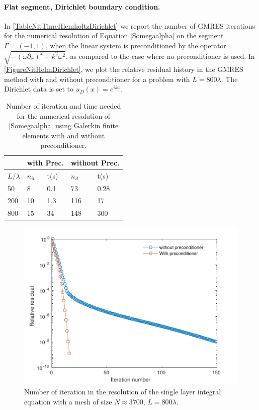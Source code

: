 \documentclass[a4paper]{article}
\begin{document}
\paragraph{Flat segment, Dirichlet boundary condition.} In \autoref{TableNitTimeHlemholtzDirichlet} we report the number of GMRES iterations for the numerical resolution of Equation \eqref{Somegaalpha} on the segment $\Gamma = (-1,1)$, when the linear system is preconditioned by the operator $\sqrt{-(\omega \partial_x)^2 - k^2 \omega^2}$, as compared to the case where no preconditioner is used.  In \autoref{FigureNitHelmDirichlet}, we plot the relative residual history in the GMRES method with and without preconditioner for a problem with $L = 800 \lambda$. The Dirichlet data is set to $u_D(x) = e^{ikx}$. 
\begin{table}[H]
	\begin{center}
		\begin{tabular}{|| m{4em} | m{4em} | m{4em} | m{4em} | m{4em}||} 
			\hline
			\multicolumn{1}{||c|}{ }&
			\multicolumn{2}{c|}{with Prec.}&\multicolumn{2}{c||}{without Prec.}\\
			\hline
			$L/\lambda$ & $n_{it}$& t(s) & $n_{it}$ & t(s)\\
			\hline\hline
			50 & 8 & 0.1 & 73 & 0.28\\
			\hline
			200 & 10 & 1.3 & 116 & 17\\
			\hline
			800 & 15 & 34 & 148 & 300\\
			\hline
		\end{tabular}
	\end{center}
	\caption{Number of iteration and time needed for the numerical resolution of \eqref{Somegaalpha} using Galerkin finite elements with and without preconditioner.}
	\label{TableNitTimeHlemholtzDirichlet}
\end{table}
\vspace{-1cm}
\begin{figure}[H]
	\centering
	\includegraphics[scale=0.5]{figs/PrecondDirichletHelmSegPDF}
	\caption{Number of iteration in the resolution of the single layer integral equation with a mesh of size $N \approx 3700$, $L = 800 \lambda$.}
	\label{FigureNitHelmDirichlet}
\end{figure}
\end{document}
